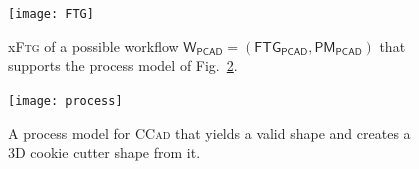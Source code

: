 % 
% 
% 
% 
% 
% 
% 


\begin{figure}[t]
   \centering
   \texttt{[image: FTG]}
   \caption{x\textsc{Ftg} of a possible workflow $\mathsf{W_{PCAD}} = 
(\mathsf{FTG_{PCAD}}, 
\mathsf{PM_{PCAD}})$ that supports the process model of 
Fig.~\ref{fig:Process}.}%
   \label{fig:PCAD-MM}%
\end{figure}


\begin{figure}[t]
\centering 
\texttt{[image: process]}
\vspace{-1em}
\caption{A process model for \textsc{CCad} that yields a valid shape and
   creates a 3D cookie cutter shape from it.} 
\label{fig:Process}%
\end{figure}


